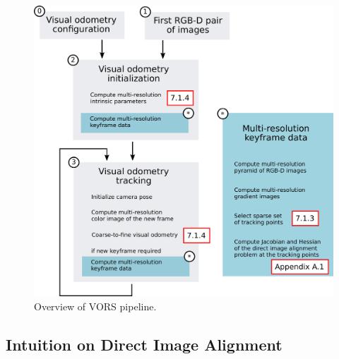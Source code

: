 \begin{figure}[ht]
	\centering
	\includegraphics[width=\linewidth]{assets/img/overview-vors.pdf}
	\caption{Overview of VORS pipeline.}%
	\label{fig:overview-vors}
\end{figure}

\subsection{Intuition on Direct Image Alignment}%
\label{sub:intuition-direct}

